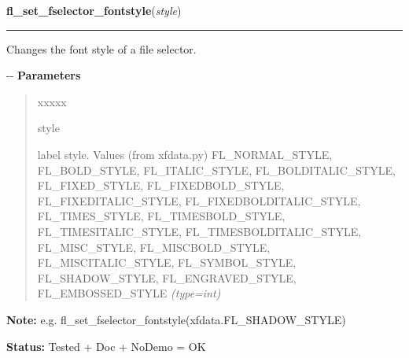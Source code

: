 \hspace{.8\funcindent}\begin{boxedminipage}{\funcwidth}

    \raggedright \textbf{fl\_set\_fselector\_fontstyle}(\textit{style})

    \vspace{-1.5ex}

    \rule{\textwidth}{0.5\fboxrule}
\setlength{\parskip}{2ex}

Changes the font style of a file selector.

-{}-
\setlength{\parskip}{1ex}
      \textbf{Parameters}
      \vspace{-1ex}

      \begin{quote}
        \begin{Ventry}{xxxxx}

          \item[style]


label style. Values (from xfdata.py) FL\_NORMAL\_STYLE, FL\_BOLD\_STYLE,
FL\_ITALIC\_STYLE, FL\_BOLDITALIC\_STYLE, FL\_FIXED\_STYLE,
FL\_FIXEDBOLD\_STYLE, FL\_FIXEDITALIC\_STYLE, FL\_FIXEDBOLDITALIC\_STYLE,
FL\_TIMES\_STYLE, FL\_TIMESBOLD\_STYLE, FL\_TIMESITALIC\_STYLE,
FL\_TIMESBOLDITALIC\_STYLE, FL\_MISC\_STYLE, FL\_MISCBOLD\_STYLE,
FL\_MISCITALIC\_STYLE, FL\_SYMBOL\_STYLE, FL\_SHADOW\_STYLE,
FL\_ENGRAVED\_STYLE, FL\_EMBOSSED\_STYLE
            {\it (type=int)}

        \end{Ventry}

      \end{quote}

\textbf{Note:} 
e.g. fl\_set\_fselector\_fontstyle(xfdata.FL\_SHADOW\_STYLE)


\textbf{Status:} 
Tested + Doc + NoDemo = OK


    \end{boxedminipage}

    \label{xformslib:flgoodies:fl_set_fselector_placement}

    \vspace{0.5ex}

